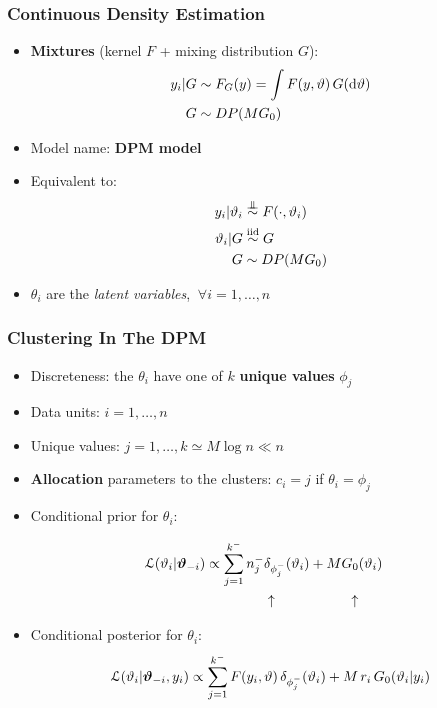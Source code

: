 \begin{frame}
	\frametitle{Continuous Density Estimation}
	\begin{itemize}
		\item \textbf{Mixtures} (kernel $F$ + mixing distribution $G$):
		\begin{align*}
			y_i | G &\sim F_G(y) = \int F(y,\vartheta) \, G(\mathrm d\vartheta) \\
			G &\sim DP(M G_0)
		\end{align*}
		\vspace{-10pt}
		\item Model name: \textbf{DPM model}
		\item Equivalent to:
		\begin{align*}
			y_i | \theta_i &\indsim F(\cdot,\theta_i) \\
			\theta_i | G &\iidsim G \\
			G &\sim DP(M G_0)
		\end{align*}
		\item $\theta_i$ are the \textit{latent variables}, $\ \forall i = 1,\dots,n$
	\end{itemize}
\end{frame}


\begin{frame}
	\frametitle{Clustering In The DPM}
	\begin{itemize}
		\item Discreteness: the $\theta_i$ have one of $k$ \textbf{unique values} $\phi_j$
		\item Data units: $i=1,\dots,n$ \\
		\item Unique values: $j=1,\dots,k \simeq M \log n \ll n$
		\item \textbf{Allocation} parameters to the clusters: $c_i = j$ if $\theta_i = \phi_j$
		\pause
		\item Conditional prior for $\theta_i$:
		\vspace{-5pt}
			\begin{minipage}{0.3\textwidth}
				\begin{align*}
					\hspace{-10pt}
					\Lc(\theta_i | \boldsymbol\theta_{-i}) \propto
					\sum_{j=1}^{k^-} n^-_j &\delta_{\phi^-_j} (\theta_i) + M G_0 (\theta_i) \\
					&\uparrow \hspace{55pt} \uparrow
				\end{align*}
			\end{minipage}%
			\begin{minipage}{0.5\textwidth}
				
			\end{minipage}
		\vspace{-5pt}
		\item Conditional posterior for $\theta_i$:
		$$ \mathcal L(\vartheta_i | \boldsymbol{\vartheta}_{-i}, y_i) \propto
		\sum_{j=1}^{k^-} F(y_i,\vartheta) \, \delta_{\phi^-_j} (\vartheta_i) + M \, r_i \, G_0(\vartheta_i | y_i) $$ %
	\end{itemize}
\end{frame}


